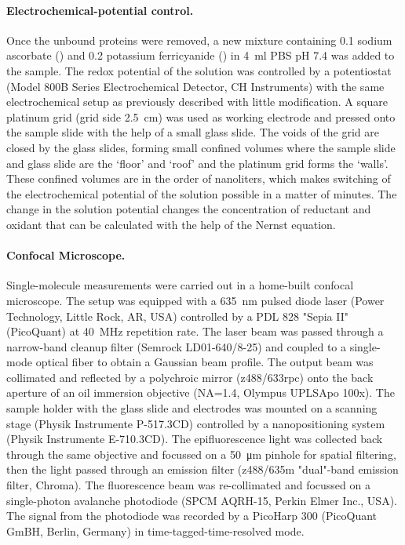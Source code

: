 \paragraph*{Electrochemical-potential control.}
Once the unbound proteins were removed, a new mixture containing \SI{0.1}{\mM} sodium ascorbate () and \SI{0.2}{\mM} potassium ferricyanide (\ce{[Fe(CN)6^3-]}) in \SI{4}{\ml} PBS pH 7.4 was added to the sample.
The redox potential of the solution was controlled by a potentiostat (Model 800B Series Electrochemical Detector, CH Instruments) with the same electrochemical setup as previously described\cite{zhang2017gold} with little modification.
A square platinum grid (grid side \SI{2.5}{\cm}) was used as working electrode and pressed onto the sample slide with the help of a small glass slide.
The voids of the grid are closed by the glass slides, forming small confined volumes where the sample slide and glass slide are the `floor' and `roof' and the platinum grid forms the `walls'.
These confined volumes are in the order of nanoliters, which makes switching of the electrochemical potential of the solution possible in a matter of minutes.
The change in the solution potential changes the concentration of reductant and oxidant that can be calculated with the help of the Nernst equation.


\paragraph*{Confocal Microscope.}
Single-molecule measurements were carried out in a home-built confocal microscope.
The setup was equipped with a \SI{635}{\nm} pulsed diode laser (Power Technology, Little Rock, AR, USA) controlled by a PDL 828 "Sepia II" (PicoQuant) at \SI{40}{\MHz} repetition rate.
The laser beam was passed through a narrow-band cleanup filter (Semrock LD01-640/8-25) and coupled to a single-mode optical fiber to obtain a Gaussian beam profile.
The output beam was collimated and reflected by a polychroic mirror (z488/633rpc) onto the back aperture of an oil immersion objective (NA=1.4, Olympus UPLSApo 100x).
The sample holder with the glass slide and electrodes was mounted on a scanning stage (Physik Instrumente P-517.3CD) controlled by a nanopositioning system (Physik Instrumente E-710.3CD). 
The epifluorescence light was collected back through the same objective and focussed on a \SI{50}{\um} pinhole for spatial filtering, then the light passed through an emission filter (z488/635m "dual"-band emission filter, Chroma). 
The fluorescence beam was re-collimated and focussed on a single-photon avalanche photodiode (SPCM AQRH-15, Perkin Elmer Inc., USA).
The signal from the photodiode was recorded by a PicoHarp 300 (PicoQuant GmBH, Berlin, Germany) in time-tagged-time-resolved mode.

